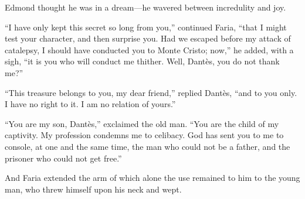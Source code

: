 Edmond thought he was in a dream—he wavered between incredulity and
joy.

“I have only kept this secret so long from you,” continued Faria, “that
I might test your character, and then surprise you. Had we escaped
before my attack of catalepsy, I should have conducted you to Monte
Cristo; now,” he added, with a sigh, “it is you who will conduct me
thither. Well, Dantès, you do not thank me?”

“This treasure belongs to you, my dear friend,” replied Dantès, “and to
you only. I have no right to it. I am no relation of yours.”

“You are my son, Dantès,” exclaimed the old man. “You are the child of
my captivity. My profession condemns me to celibacy. God has sent you
to me to console, at one and the same time, the man who could not be a
father, and the prisoner who could not get free.”

And Faria extended the arm of which alone the use remained to him to
the young man, who threw himself upon his neck and wept.
